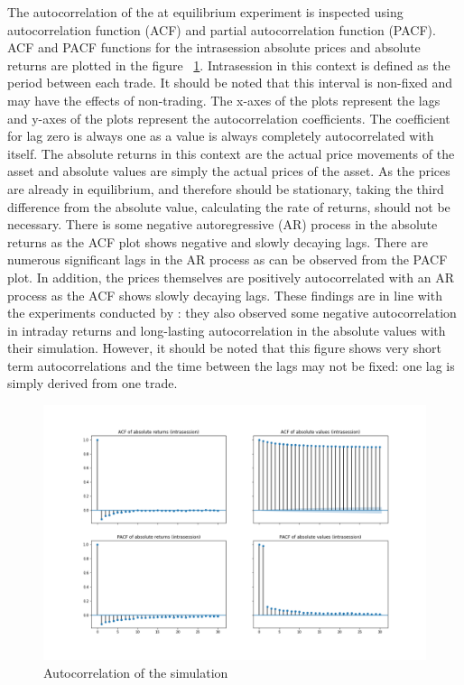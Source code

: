 The autocorrelation of the at equilibrium experiment is inspected using autocorrelation function (ACF) and partial 
autocorrelation function (PACF). ACF and PACF functions for the intrasession absolute prices and absolute returns 
are plotted in the figure ~\ref{fig:basic_autocorr}. Intrasession in this context is defined as the period 
between each trade. It should be noted that this interval is non-fixed and may have the effects of non-trading. 
The x-axes of the plots represent the lags and y-axes of the plots represent the 
autocorrelation coefficients. The coefficient for lag zero is always one as a value is always completely autocorrelated with itself. 
The absolute returns in this context are the actual price movements of 
the asset and absolute values are simply the actual prices of the asset. As the prices are already in equilibrium, and therefore should be 
stationary, taking the third difference from the absolute value, calculating the rate of returns, should not be necessary. There is some negative 
autoregressive (AR) process in the absolute returns as the ACF plot shows negative and slowly decaying lags. There are numerous 
significant lags in the AR process as can be observed from the PACF plot. In addition, the prices themselves are 
positively autocorrelated with an AR process as the ACF shows slowly decaying lags. These findings are in line with the experiments conducted by \citet{Raberto05}: 
they also observed some negative autocorrelation in intraday returns and long-lasting autocorrelation in the absolute
values with their simulation. However, it should be noted that this figure shows very short term
autocorrelations and the time between the lags may not be fixed: one lag is simply derived from one
trade. 


\begin{figure}[H]
    \includegraphics[width=\linewidth]{plots/basic_autocorrelation_intra.png}
    \caption{Autocorrelation of the simulation}
    \label{fig:basic_autocorr}
\end{figure}

